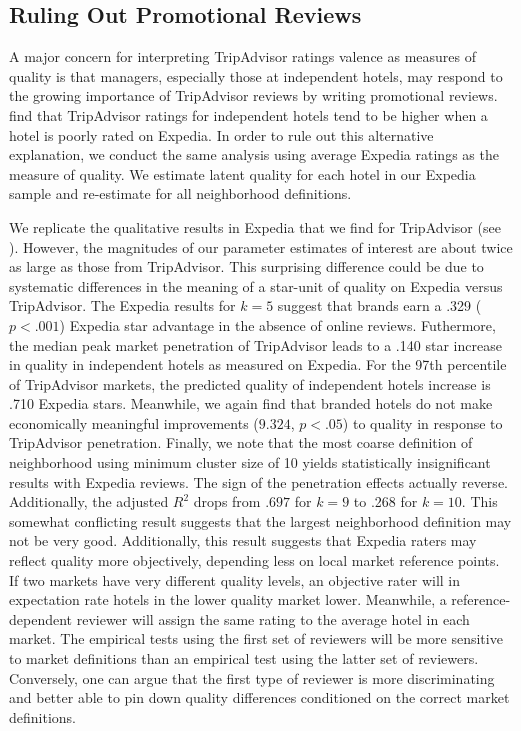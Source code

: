 \documentclass[mksc,blindrev]{informs3} %
\begin{document}
\subsection{Ruling Out Promotional Reviews}

A major concern for interpreting TripAdvisor ratings valence as measures of quality is that managers, especially those at independent hotels, may respond to the growing importance of TripAdvisor reviews by writing promotional reviews. \citet{mayzlin2014promotional} find that TripAdvisor ratings for independent hotels tend to be higher when a hotel is poorly rated on Expedia. In order to rule out this alternative explanation, we conduct the same analysis using average Expedia ratings as the measure of quality. We estimate latent quality for each hotel in our Expedia sample and re-estimate  for all neighborhood definitions. 

We replicate the qualitative results in Expedia that we find for TripAdvisor (see ). However, the magnitudes of our parameter estimates of interest are about twice as large as those from TripAdvisor. This surprising difference could be due to systematic differences in the meaning of a star-unit of quality on Expedia versus TripAdvisor. The Expedia results for $k=5$ suggest that brands earn a .329 ($p<.001$) Expedia star advantage in the absence of online reviews. Futhermore, the median peak market penetration of TripAdvisor leads to a .140 star increase in quality in independent hotels as measured on Expedia. For the 97th percentile of TripAdvisor markets, the predicted quality of independent hotels increase is .710 Expedia stars. Meanwhile, we again find that branded hotels do not make economically meaningful improvements ($9.324$, $p<.05$) to quality in response to TripAdvisor penetration. Finally, we note that the most coarse definition of neighborhood using minimum cluster size of 10 yields statistically insignificant results with Expedia reviews. The sign of the penetration effects actually reverse. Additionally, the adjusted $R^2$ drops from $.697$ for $k=9$ to .268 for $k=10$. This somewhat conflicting result suggests that the largest neighborhood definition may not be very good. Additionally, this result suggests that Expedia raters may reflect quality more objectively, depending less on local market reference points. If two markets have very different quality levels, an objective rater will in expectation rate hotels in the lower quality market lower. Meanwhile, a reference-dependent reviewer will assign the same rating to the average hotel in each market. The empirical tests using the first set of reviewers will be more sensitive to market definitions than an empirical test using the latter set of reviewers. Conversely, one can argue that the first type of reviewer is more discriminating and better able to pin down quality differences conditioned on the correct market definitions. 
\end{document}
